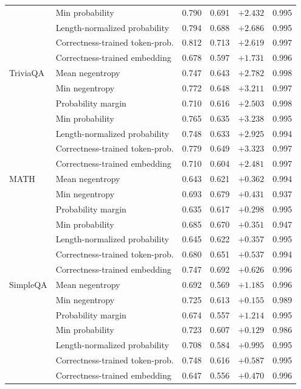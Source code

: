 \begin{longtable}{llrrrr}
 & Min probability & 0.790 & 0.691 & $+2.432$ & 0.995 \\
 & Length-normalized probability & 0.794 & 0.688 & $+2.686$ & 0.995 \\
 & Correctness-trained token-prob. &0.812 & 0.713 & $+2.619$ & 0.997 \\
 & Correctness-trained embedding &0.678 & 0.597 & $+1.731$ & 0.996 \\
TriviaQA & Mean negentropy & 0.747 & 0.643 & $+2.782$ & 0.998 \\
 & Min negentropy & 0.772 & 0.648 & $+3.211$ & 0.997 \\
 & Probability margin & 0.710 & 0.616 & $+2.503$ & 0.998 \\
 & Min probability & 0.765 & 0.635 & $+3.238$ & 0.995 \\
 & Length-normalized probability & 0.748 & 0.633 & $+2.925$ & 0.994 \\
 & Correctness-trained token-prob. &0.779 & 0.649 & $+3.323$ & 0.997 \\
 & Correctness-trained embedding &0.710 & 0.604 & $+2.481$ & 0.997 \\
MATH & Mean negentropy & 0.643 & 0.621 & $+0.362$ & 0.994 \\
 & Min negentropy & 0.693 & 0.679 & $+0.431$ & 0.937 \\
 & Probability margin & 0.635 & 0.617 & $+0.298$ & 0.995 \\
 & Min probability & 0.685 & 0.670 & $+0.351$ & 0.947 \\
 & Length-normalized probability & 0.645 & 0.622 & $+0.357$ & 0.995 \\
 & Correctness-trained token-prob. &0.680 & 0.651 & $+0.537$ & 0.994 \\
 & Correctness-trained embedding &0.747 & 0.692 & $+0.626$ & 0.996 \\
SimpleQA & Mean negentropy & 0.692 & 0.569 & $+1.185$ & 0.996 \\
 & Min negentropy & 0.725 & 0.613 & $+0.155$ & 0.989 \\
 & Probability margin & 0.674 & 0.557 & $+1.214$ & 0.995 \\
 & Min probability & 0.723 & 0.607 & $+0.129$ & 0.986 \\
 & Length-normalized probability & 0.708 & 0.584 & $+0.995$ & 0.995 \\
 & Correctness-trained token-prob. &0.748 & 0.616 & $+0.587$ & 0.995 \\
 & Correctness-trained embedding &0.647 & 0.556 & $+0.470$ & 0.996 \\

\end{longtable}
